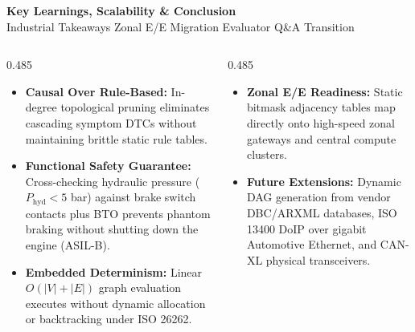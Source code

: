 \documentclass[aspectratio=169,10pt]{beamer}
\newcommand{\slidetitle}[2]{%
  \vspace{0.08cm}
  {\Large\bfseries\color{vectorred}#1}\\[2pt]
  {\footnotesize\color{slategrey}#2}
  \vspace{0.10cm}
}
\begin{document}
\begin{frame}[t]
\slidetitle{Key Learnings, Scalability \& Conclusion}{Industrial Takeaways \textbullet{} Zonal E/E Migration \textbullet{} Evaluator Q\&A Transition}

\begin{columns}[T,totalwidth=\textwidth]

  \begin{column}{0.485\textwidth}
    \begin{tcolorbox}[cardstyle, colframe=vectorred!70, colbacktitle=vectorred!8, height=5.12cm,
      title={\normalsize\bfseries\color{vectorred} Key Engineering Learnings}]
      \footnotesize\color{slatedark}\raggedright\vspace{-4pt}
      \begin{itemize}\setlength{\itemsep}{2pt}\setlength{\leftmargini}{10pt}
        \item \textbf{Causal Over Rule-Based:} In-degree topological pruning eliminates cascading symptom DTCs without maintaining brittle static rule tables.
        \item \textbf{Functional Safety Guarantee:} Cross-checking hydraulic pressure ($P_{\text{hyd}} < 5$ bar) against brake switch contacts plus BTO prevents phantom braking without shutting down the engine (ASIL-B).
        \item \textbf{Embedded Determinism:} Linear $O(|V| + |E|)$ graph evaluation executes without dynamic allocation or backtracking under ISO 26262.
      \end{itemize}
    \end{tcolorbox}
  \end{column}

  \begin{column}{0.485\textwidth}
    \begin{tcolorbox}[cardstyle, colframe=accentblue!70, colbacktitle=accentblue!8, height=5.12cm,
      title={\normalsize\bfseries\color{accentblue} Zonal Scalability \& Future Roadmap}]
      \footnotesize\color{slatedark}\raggedright\vspace{-4pt}
      \begin{itemize}\setlength{\itemsep}{2pt}\setlength{\leftmargini}{10pt}
        \item \textbf{Zonal E/E Readiness:} Static bitmask adjacency tables map directly onto high-speed zonal gateways and central compute clusters.
        \item \textbf{Future Extensions:} Dynamic DAG generation from vendor DBC/ARXML databases, ISO 13400 DoIP over gigabit Automotive Ethernet, and CAN-XL physical transceivers.
      \end{itemize}
    \end{tcolorbox}
  \end{column}


\end{columns}
\end{frame}
\end{document}
